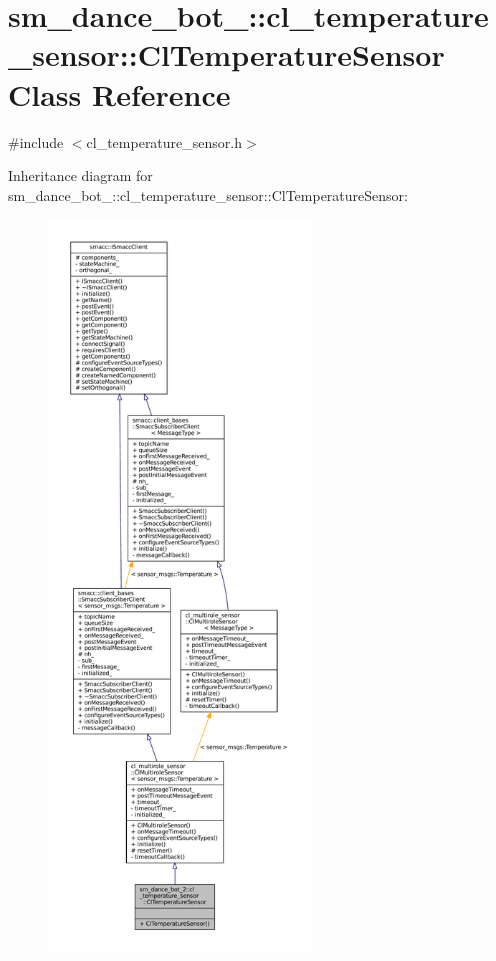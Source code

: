 \hypertarget{classsm__dance__bot__2_1_1cl__temperature__sensor_1_1ClTemperatureSensor}{}\section{sm\+\_\+dance\+\_\+bot\+\_\+:\+:cl\+\_\+temperature\+\_\+sensor\+:\+:Cl\+Temperature\+Sensor Class Reference}
\label{classsm__dance__bot__2_1_1cl__temperature__sensor_1_1ClTemperatureSensor}


{\ttfamily \#include $<$cl\+\_\+temperature\+\_\+sensor.\+h$>$}



Inheritance diagram for sm\+\_\+dance\+\_\+bot\+\_\+:\+:cl\+\_\+temperature\+\_\+sensor\+:\+:Cl\+Temperature\+Sensor\+:
\nopagebreak
\begin{figure}[H]
\begin{center}
\leavevmode
\includegraphics[height=550pt]{classsm__dance__bot__2_1_1cl__temperature__sensor_1_1ClTemperatureSensor__inherit__graph}
\end{center}
\end{figure}



